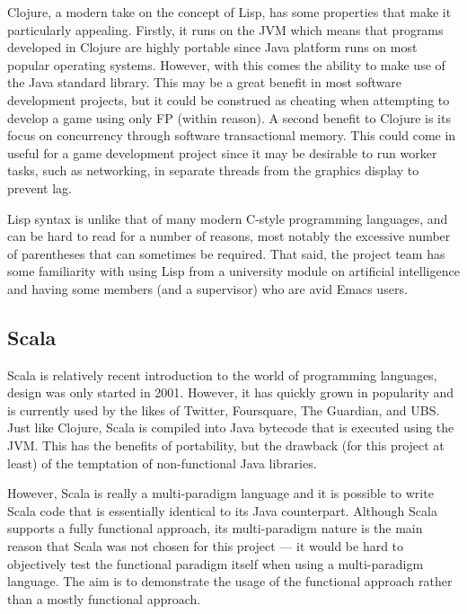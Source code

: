 Clojure, a modern take on the concept of Lisp, has some properties that make it particularly appealing. Firstly, it runs on the JVM which means that programs developed in Clojure are highly portable since Java platform runs on most popular operating systems. However, with this comes the ability to make use of the Java standard library. This may be a great benefit in most software development projects, but it could be construed as cheating when attempting to develop a game using only FP (within reason). A second benefit to Clojure is its focus on concurrency through software transactional memory. This could come in useful for a game development project since it may be desirable to run worker tasks, such as networking, in separate threads from the graphics display to prevent lag.

Lisp syntax is unlike that of many modern C-style programming languages, and can be hard to read for a number of reasons, most notably the excessive number of parentheses that can sometimes be required. That said, the project team has some familiarity with using Lisp from a university module on artificial intelligence and having some members (and a supervisor) who are avid Emacs users.

\subsection{Scala}



Scala is relatively recent introduction to the world of programming languages, design was only started in 2001. However, it has quickly grown in popularity and is currently used by the likes of Twitter, Foursquare, The Guardian, and UBS. Just like Clojure, Scala is compiled into Java bytecode that is executed using the JVM. This has the benefits of portability, but the drawback (for this project at least) of the temptation of non-functional Java libraries.

However, Scala is really a multi-paradigm language and it is possible to write Scala code that is essentially identical to its Java counterpart. Although Scala supports a fully functional approach, its multi-paradigm nature is the main reason that Scala was not chosen for this project --- it would be hard to objectively test the functional paradigm itself when using a multi-paradigm language. The aim is to demonstrate the usage of the functional approach rather than a mostly functional approach. 

